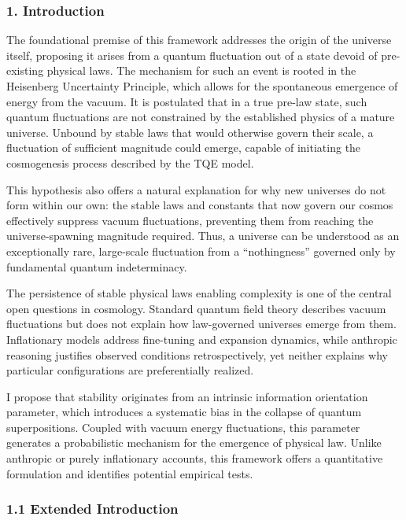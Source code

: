\subsubsection{\texorpdfstring{\textbf{1.
Introduction}}{1. Introduction}}\label{introduction}

The foundational premise of this framework addresses the origin of the
universe itself, proposing it arises from a quantum fluctuation out of a
state devoid of pre-existing physical laws. The mechanism for such an
event is rooted in the Heisenberg Uncertainty Principle, which allows
for the spontaneous emergence of energy from the vacuum. It is
postulated that in a true pre-law state, such quantum fluctuations are
not constrained by the established physics of a mature universe. Unbound
by stable laws that would otherwise govern their scale, a fluctuation of
sufficient magnitude could emerge, capable of initiating the
cosmogenesis process described by the TQE model.

This hypothesis also offers a natural explanation for why new universes
do not form within our own: the stable laws and constants that now
govern our cosmos effectively suppress vacuum fluctuations, preventing
them from reaching the universe-spawning magnitude required. Thus, a
universe can be understood as an exceptionally rare, large-scale
fluctuation from a ``nothingness'' governed only by fundamental quantum
indeterminacy.

The persistence of stable physical laws enabling complexity is one of
the central open questions in cosmology. Standard quantum field theory
describes vacuum fluctuations but does not explain how law-governed
universes emerge from them. Inflationary models address fine-tuning and
expansion dynamics, while anthropic reasoning justifies observed
conditions retrospectively, yet neither explains why particular
configurations are preferentially realized.

I propose that stability originates from an intrinsic information
orientation parameter, which introduces a systematic bias in the
collapse of quantum superpositions. Coupled with vacuum energy
fluctuations, this parameter generates a probabilistic mechanism for the
emergence of physical law. Unlike anthropic or purely inflationary
accounts, this framework offers a quantitative formulation and
identifies potential empirical tests.

\subsubsection{\texorpdfstring{\textbf{1.1 Extended
Introduction}}{1.1 Extended Introduction}}\label{extended-introduction}

